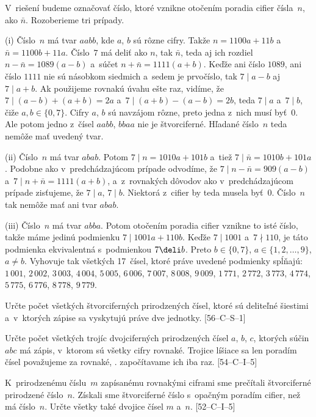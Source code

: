 {%
V~riešení budeme označovať číslo, ktoré vznikne otočením poradia cifier čísla~$n$, ako $\bar n$. Rozoberieme tri
prípady.

(i)
Číslo~$n$ má tvar $aabb$, kde $a$, $b$ sú rôzne cifry. Takže $n=1100a+11b$ a~$\bar n=1100b+11a$. Číslo~$7$ má deliť ako $n$, tak $\bar{n}$, teda aj ich rozdiel $n-\bar{n}=1089(a-b)$ a~súčet $n+\bar{n}=1111(a+b)$. Keďže ani číslo $1089$, ani číslo $1111$ nie sú násobkom siedmich a~sedem je prvočíslo, tak $7\mid a-b$ aj $7\mid a+b$. Ak použijeme rovnakú úvahu ešte raz, vidíme, že $7\mid (a-b)+(a+b)=2a$ a~$7\mid (a+b)-(a-b)=2b$, teda $7\mid a$ a~$7\mid b$, čiže $a,b\in\{0,7\}$. Cifry $a$, $b$ sú navzájom rôzne, preto jedna z~nich musí byť~$0$. Ale potom jedno z~čísel $aabb$, $bbaa$ nie je štvorciferné. Hľadané číslo~$n$ teda nemôže mať uvedený tvar.

(ii)
Číslo~$n$ má tvar $abab$. Potom $7\mid n=1010a+101b$ a~tiež $7\mid \bar{n}=1010b+101a$. Podobne ako v~predchádzajúcom prípade odvodíme, že $7\mid n-\bar{n}=909(a-b)$ a~$7\mid n+\bar{n}=1111(a+b)$, a~z~rovnakých dôvodov ako v~predchádzajúcom prípade zisťujeme, že $7\mid a$, $7\mid b$. Niektorá z~cifier by teda musela byť~$0$. Číslo~$n$ tak nemôže mať ani tvar $abab$.

(iii) Číslo~$n$ má tvar $abba$. Potom otočením poradia cifier vznikne to isté číslo, takže máme jedinú podmienku
 $7\mid 1001a+110b$. Keďže $7\mid 1001$ a~$7\nmid 110$, je táto podmienka ekvivalentná s~podmienkou $7\deli b$. Preto $b\in\{0,7\}$, $a\in\{1,2,\dots,9\}$, $a\ne b$. Vyhovuje tak všetkých 17~čísel, ktoré práve uvedené podmienky spĺňajú: $1\,001$, $2\,002$, $3\,003$, $4\,004$,
 $5\,005$, $6\,006$, $7\,007$, $8\,008$, $9\,009$, $1\,771$,
 $2\,772$, $3\,773$, $4\,774$, $5\,775$, $6\,776$, $8\,778$, $9\,779$.

Určte počet všetkých štvorciferných prirodzených čísel, ktoré sú deliteľné šiestimi a~v~ktorých zápise sa vyskytujú práve dve jednotky. [56--C--S--1]

Určte počet všetkých trojíc dvojciferných prirodzených čísel $a$, $b$, $c$, ktorých súčin $abc$ má zápis, v~ktorom sú všetky cifry rovnaké. Trojice líšiace sa len poradím čísel považujeme za rovnaké, \tj. započítavame ich iba raz. [54--C--I--5]

K~prirodzenému číslu~$m$ zapísanému rovnakými ciframi sme prečítali štvorciferné prirodzené číslo~$n$. Získali sme štvorciferné číslo s~opačným poradím cifier, než má číslo~$n$. Určte všetky také dvojice čísel $m$ a~$n$. [52--C--I--5]
}


